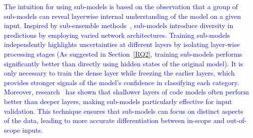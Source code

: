 \textcolor{blue}{The intuition for using sub-models is based on the observation that a group of sub-models can reveal layerwise internal understanding of the model on a given input. Inspired by sub-ensemble methods~\cite{gawlikowski2023survey}, sub-models introduce diversity in predictions by employing varied network architectures. Training sub-models independently highlights uncertainties at different layers by isolating layer-wise processing stages (As suggested in Section~\ref{RQ2}, training sub-models performs significantly better than directly using hidden states of the original model). It is only necessary to train the dense layer while freezing the earlier layers, which provides stronger signals of the model's confidence in classifying each category. Moreover, research~\cite{maunveiling} has shown that shallower layers of code models often perform better than deeper layers, making sub-models particularly effective for input validation. This technique ensures that sub-models can focus on distinct aspects of the data, leading to more accurate differentiation between in-scope and out-of-scope inputs.}

